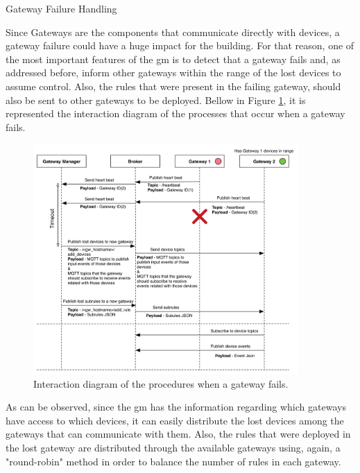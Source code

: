 \begin{Paragraph}{Gateway Failure Handling}
	
Since Gateways are the components that communicate directly with devices, a gateway failure could have a huge impact for the building. For that reason, one of the most important features of the \ac{gm} is to detect that a gateway fails and, as addressed before, inform other gateways within the range of the lost devices to assume control. Also, the rules that were present in the failing gateway, should also be sent to other gateways to be deployed. Bellow in Figure \ref{fig:gwdown}, it is represented the interaction diagram of the processes that occur when a gateway fails. 

\begin{figure}[H]
	\centering
	\includegraphics[width=0.9\textwidth]{figures/gwdown.png}
	\caption{Interaction diagram of the procedures when a gateway fails.}
	\label{fig:gwdown}
\end{figure}
	
As can be observed, since the \ac{gm} has the information regarding which gateways have access to which devices, it can easily distribute the lost devices among the gateways that can communicate with them. Also, the rules that were deployed in the lost gateway are distributed through the available gateways using, again, a "round-robin" method in order to balance the number of rules in each gateway.  

\end{Paragraph}

